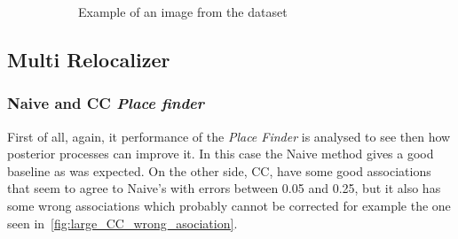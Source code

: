 \begin{figure}[htpb]
\begin{subfigure}[b]{5cm}
         \caption{Example of an image from the dataset}                
         \label{fig:large_desktop_example_image}
  \end{subfigure}
  \caption{}
\end{figure}

\subsection{Multi Relocalizer}
\label{sub:multi_relocalizer_large}

\subsubsection{Naive and CC \textit{Place finder}}
\label{ssub:naive_and_cc_place_finder_large}

First of all, again, it performance of the \textit{Place Finder} is analysed to see then how posterior processes can improve it. In this case the Naive method gives a good baseline as was expected. On the other side, CC, have some good associations that seem to agree to Naive's with errors between 0.05 and 0.25, but it also has some wrong associations which probably cannot be corrected for example the one seen in~\ref{fig:large_CC_wrong_asociation}.\\

